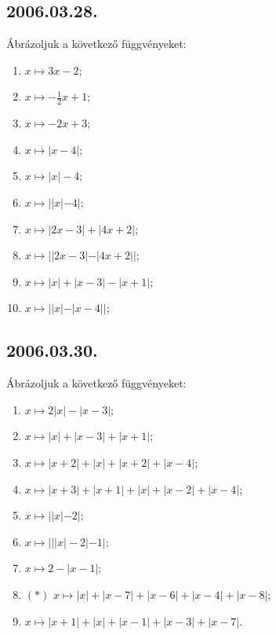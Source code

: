 \subsection*{2006.03.28.}
Ábrázoljuk a következő függvényeket:
\begin{enumerate}
\item $x \mapsto 3x-2$;
\item $x \mapsto -\frac{1}{2}x+1$;
\item $x \mapsto -2x+3$;
\item $x \mapsto |x-4|$;
\item $x \mapsto |x|-4$;
\item $x \mapsto ||x|-4|$;
\item $x \mapsto |2x-3|+|4x+2|$;
\item $x \mapsto ||2x-3|-|4x+2||$;
\item $x \mapsto |x|+|x-3|-|x+1|$;
\item $x \mapsto ||x|-|x-4||$;
\end{enumerate}

\subsection*{2006.03.30.}
Ábrázoljuk a következő függvényeket:
\begin{enumerate}
\item $x \mapsto 2|x|-|x-3|$;
\item $x \mapsto |x|+|x-3|+|x+1|$;
\item $x \mapsto |x+2|+|x|+|x+2|+|x-4|$;
\item $x \mapsto |x+3|+|x+1|+|x|+|x-2|+|x-4|$;
\item $x \mapsto ||x|-2|$;
\item $x \mapsto |||x|-2|-1|$;
\item $x \mapsto 2-|x-1|$;
\item $(*)$ $ x \mapsto |x|+|x-7|+|x-6|+|x-4|+|x-8|$;
\item $x \mapsto |x+1|+|x|+|x-1|+|x-3|+|x-7|$.
\end{enumerate}

